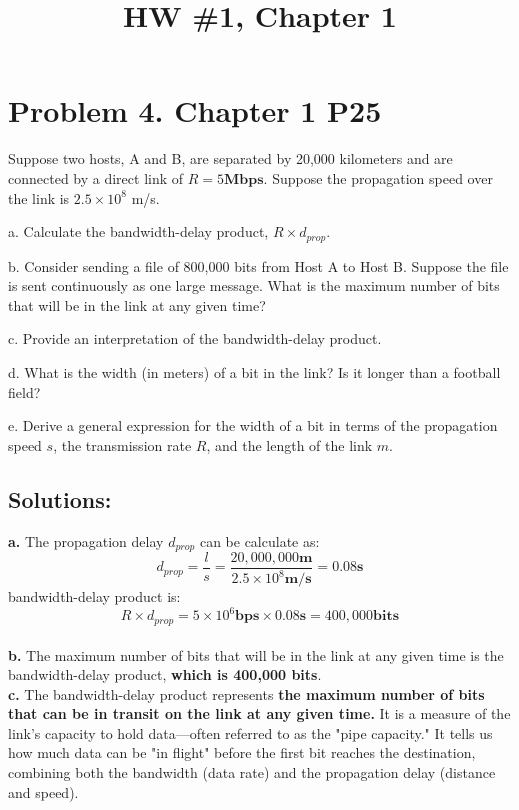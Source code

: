 \documentclass{cshwk}
\begin{document}
\title{HW \#1, Chapter 1}
\maketitle



\section*{Problem 4. Chapter 1 P25}

Suppose two hosts, A and B, are separated by 20,000 kilometers and are connected by a direct link of $R = 5 \mathbf{Mbps}$. Suppose the propagation speed over the link is $2.5 \times 10^8$ m/s.

a. Calculate the bandwidth-delay product, $R \times d_{prop}$.

b. Consider sending a file of 800,000 bits from Host A to Host B. Suppose the file is sent continuously as one large message. What is the maximum number of bits that will be in the link at any given time?

c. Provide an interpretation of the bandwidth-delay product.

d. What is the width (in meters) of a bit in the link? Is it longer than a football field?

e. Derive a general expression for the width of a bit in terms of the propagation speed $s$, the transmission rate $R$, and the length of the link $m$.

\subsection*{Solutions:}

\noindent\textbf{a.} The propagation delay $d_{prop}$ can be calculate as:
$$
    d_{prop} = \frac{l}{s} = \frac{20,000,000 \mathbf{m}}{2.5 \times 10^8 \mathbf{m/s}} = 0.08 \mathbf{s}
$$
bandwidth-delay product is:
$$
    R \times d_{prop} = 5 \times 10^6 \mathbf{bps} \times 0.08 \mathbf{s} = 400,000 \mathbf{bits}
$$
\\

\noindent\textbf{b.} The maximum number of bits that will be in the link at any given time is the bandwidth-delay product, \textbf{which is 400,000 bits}.
\\

\noindent\textbf{c.} The bandwidth-delay product represents \textbf{the maximum number of bits that can be in transit on the link at any given time.} It is a measure of the link's capacity to hold data—often referred to as the "pipe capacity." It tells us how much data can be "in flight" before the first bit reaches the destination, combining both the bandwidth (data rate) and the propagation delay (distance and speed).
\\
\end{document}
